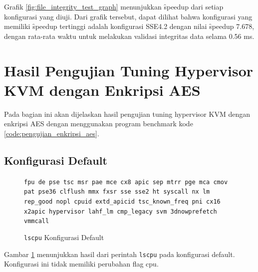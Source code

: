 Grafik \ref{fig:file_integrity_test_graph} menunjukkan \f{speedup} dari setiap konfigurasi yang diuji. Dari grafik tersebut, dapat dilihat bahwa konfigurasi yang memiliki \f{speedup} tertinggi adalah konfigurasi SSE4.2 dengan nilai \f{speedup} 7.678, dengan rata-rata waktu untuk melakukan validasi integritas data selama 0.56 ms.

\section{Hasil Pengujian Tuning Hypervisor KVM dengan Enkripsi AES}
Pada bagian ini akan dijelaskan hasil pengujian tuning hypervisor KVM dengan enkripsi AES dengan menggunakan program benchmark kode \ref{code:pengujian_enkripsi_aes}.

\subsection{Konfigurasi Default}
\begin{figure}
    \texttt{fpu de pse tsc msr pae mce cx8 apic sep mtrr pge mca cmov pat pse36 clflush mmx fxsr sse sse2 ht syscall nx lm rep\_good nopl cpuid extd\_apicid tsc\_known\_freq pni cx16 x2apic hypervisor lahf\_lm cmp\_legacy svm 3dnowprefetch vmmcall}
    \caption{\texttt{lscpu} Konfigurasi Default}
    \label{fig:lscpu_aes_test_default}
\end{figure}

Gambar \ref{fig:lscpu_aes_test_default} menunjukkan hasil dari perintah \texttt{lscpu} pada konfigurasi default. Konfigurasi ini tidak memiliki perubahan flag cpu.

